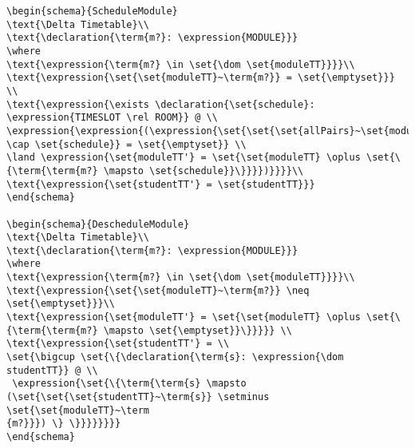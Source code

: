 \begin{verbatim}
\begin{schema}{ScheduleModule}
\text{\Delta Timetable}\\
\text{\declaration{\term{m?}: \expression{MODULE}}}
\where
\text{\expression{\term{m?} \in \set{\dom \set{moduleTT}}}}\\
\text{\expression{\set{\set{moduleTT}~\term{m?}} = \set{\emptyset}}} \\
\text{\expression{\exists \declaration{\set{schedule}: \expression{TIMESLOT \rel ROOM}} @ \\
\expression{\expression{(\expression{\set{\set{\set{allPairs}~\set{moduleTT}} \cap \set{schedule}} = \set{\emptyset}} \\
\land \expression{\set{moduleTT'} = \set{\set{moduleTT} \oplus \set{\{\term{\term{m?} \mapsto \set{schedule}}\}}}})}}}}\\
\text{\expression{\set{studentTT'} = \set{studentTT}}}
\end{schema}

\begin{schema}{DescheduleModule}
\text{\Delta Timetable}\\
\text{\declaration{\term{m?}: \expression{MODULE}}}
\where
\text{\expression{\term{m?} \in \set{\dom \set{moduleTT}}}}\\
\text{\expression{\set{\set{moduleTT}~\term{m?}} \neq \set{\emptyset}}}\\
\text{\expression{\set{moduleTT'} = \set{\set{moduleTT} \oplus \set{\{\term{\term{m?} \mapsto \set{\emptyset}}\}}}}} \\
\text{\expression{\set{studentTT'} = \\
\set{\bigcup \set{\{\declaration{\term{s}: \expression{\dom studentTT}} @ \\
 \expression{\set{\{\term{\term{s} \mapsto (\set{\set{\set{studentTT}~\term{s}} \setminus \set{\set{moduleTT}~\term
{m?}}}) \} \}}}}}}}}
\end{schema}


\end{verbatim}
